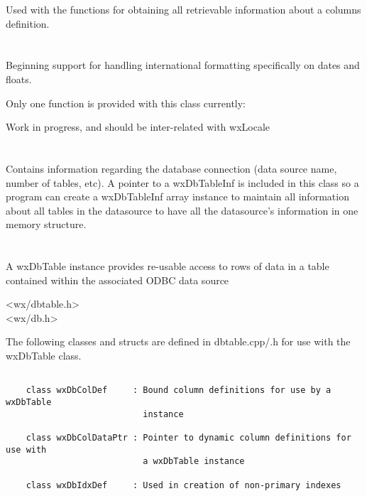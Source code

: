 Used with the  functions for obtaining all retrievable information about a columns definition.

\section{}\label{wxdbcolfor}

Beginning support for handling international formatting specifically on dates and floats.  

Only one function is provided with this class currently:

\label{wxdbcolforformat}

\label{wxdbcolforformat}

Work in progress, and should be inter-related with wxLocale

\section{}\label{wxdbinf}

Contains information regarding the database connection (data source name, 
number of tables, etc).  A pointer to a wxDbTableInf is included in this 
class so a program can create a wxDbTableInf array instance to maintain all
information about all tables in the datasource to have all the datasource's
information in one memory structure.

\section{}\label{wxdbtable}

A wxDbTable instance provides re-usable access to rows of data in
a table contained within the associated ODBC data source


<wx/dbtable.h>\\
<wx/db.h>


The following classes and structs are defined in dbtable.cpp/.h for use with the wxDbTable class.
\begin{verbatim}

    class wxDbColDef     : Bound column definitions for use by a wxDbTable 
                           instance

    class wxDbColDataPtr : Pointer to dynamic column definitions for use with
                           a wxDbTable instance

    class wxDbIdxDef     : Used in creation of non-primary indexes

\end{verbatim}

